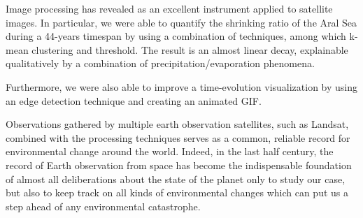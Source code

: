 Image processing has revealed as an excellent instrument applied to satellite images. 
In particular, we were able to quantify the shrinking ratio of the Aral Sea during a 44-years timespan by using a combination of techniques, among which k-mean clustering and threshold. 
The result is an almost linear decay, explainable qualitatively by a combination of precipitation/evaporation phenomena.

Furthermore, we were also able to improve a time-evolution visualization by using an edge detection technique and creating an animated GIF.

Observations gathered by multiple earth observation satellites, such as Landsat, combined with the processing techniques serves as a common, reliable record for environmental change around the world. 
Indeed, in the last half century, the record of Earth observation from space has become the indispensable foundation of almost all deliberations about the state of the planet only to study our case, but also to keep track on all kinds of environmental changes which can put us a step ahead of any environmental catastrophe. 
